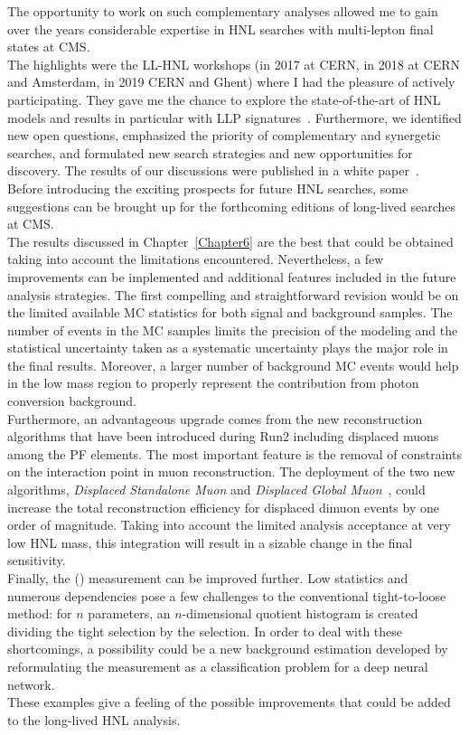 The opportunity to work on such complementary analyses
allowed me to gain over the years considerable expertise in HNL
searches with multi-lepton final states at CMS.\\
The highlights were the LL-HNL workshops (in 2017 at CERN, in 2018 at
CERN and
Amsterdam, in 2019 CERN and Ghent) where I had the pleasure
of actively participating.
 They gave me the chance to explore the 
state-of-the-art of HNL models and results in particular with LLP
signatures~\cite{Alimena_2020}. Furthermore, we identified new open
questions, emphasized the priority of complementary and synergetic
searches, and formulated new search strategies and new opportunities
for discovery. The results of our discussions were published in a
white paper~\cite{Alimena_2020}.\\


Before introducing the exciting prospects for future HNL searches,
some suggestions can be brought up for the forthcoming editions
of long-lived \hnl searches at CMS.\\
The results discussed in Chapter~\ref{Chapter6} are the best that could be obtained taking into
account the limitations encountered. Nevertheless, a few improvements can
be implemented and additional features included in the future analysis
strategies. The first compelling and straightforward revision would be on the limited
available MC statistics for both signal and background samples. The number of
events in the MC samples limits the precision of the modeling and the
 statistical uncertainty taken as a systematic uncertainty plays the
 major role in the final results. Moreover, a larger number of background MC
 events would help in the low mass region to properly represent the
 contribution from photon conversion background.\\
Furthermore, an advantageous upgrade comes from the new reconstruction
algorithms that have been introduced during Run2 including displaced
muons among the PF elements.
The most important feature is the removal of constraints on the
interaction point in muon reconstruction. The deployment of the two new algorithms,
\emph{Displaced Standalone Muon} and \emph{Displaced Global Muon}~\cite{CMS-DP-2015-015},
could increase the total reconstruction efficiency for displaced dimuon
events by one order of magnitude. Taking into account the limited analysis
acceptance at very low HNL mass, this integration will
result in a sizable change in the final sensitivity.\\
Finally, the \Dfr (\dfr) measurement can be improved further. Low statistics and numerous \dfr dependencies
pose a few challenges to the conventional tight-to-loose method: for
$n$ \dfr parameters, an $n$-dimensional quotient histogram is created
dividing the tight selection by the \fo selection. In order to deal
with these shortcomings, a possibility could be a new background
estimation developed by
reformulating the \dfr measurement as a classification problem
for a deep neural network.\\
These examples give a feeling of the possible improvements that could
be added to the long-lived HNL analysis.\\


